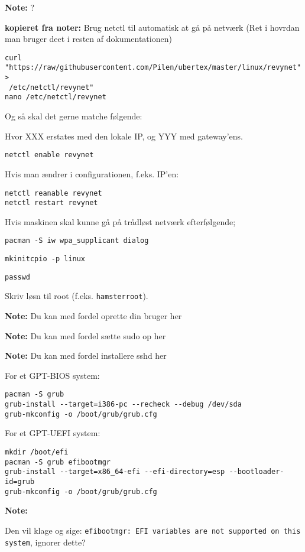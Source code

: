 \documentclass[10pt,a4paper,danish]{article}
\newcommand{\note}[1]{\begin{mdframed}[style=note]\textbf{Note:}
    #1\end{mdframed}}
\begin{document}
\note{?}
\begin{mdframed}[style=note]\textbf{kopieret fra noter:}
Brug netctl til automatisk at gå på netværk
(Ret i hovrdan man bruger deet i resten af dokumentationen)
\begin{verbatim}
curl "https://raw/githubusercontent.com/Pilen/ubertex/master/linux/revynet" >
 /etc/netctl/revynet"
nano /etc/netctl/revynet
\end{verbatim}
Og så skal det gerne matche følgende:
\begin{mdframed}[style=code]
  
\end{mdframed}
Hvor XXX erstates med den lokale IP, og YYY med gateway'ens.

\begin{verbatim}
netctl enable revynet
\end{verbatim}
Hvis man ændrer i configurationen, f.eks. IP'en:
\begin{verbatim}
netctl reanable revynet
netctl restart revynet
\end{verbatim}
\end{mdframed}

Hvis maskinen skal kunne gå på trådløst netværk efterfølgende;
\begin{verbatim}
pacman -S iw wpa_supplicant dialog
\end{verbatim}

\begin{verbatim}
mkinitcpio -p linux
\end{verbatim}
\begin{verbatim}
passwd
\end{verbatim}
Skriv løsn til root (f.eks. \texttt{hamsterroot}).

\note{Du kan med fordel oprette din bruger her}
\note{Du kan med fordel sætte sudo op her}
\note{Du kan med fordel installere sshd her}

For et GPT-BIOS system:
\begin{verbatim}
pacman -S grub
grub-install --target=i386-pc --recheck --debug /dev/sda
grub-mkconfig -o /boot/grub/grub.cfg
\end{verbatim}
For et GPT-UEFI system:
\begin{verbatim}
mkdir /boot/efi
pacman -S grub efibootmgr
grub-install --target=x86_64-efi --efi-directory=esp --bootloader-id=grub
grub-mkconfig -o /boot/grub/grub.cfg
\end{verbatim}
\note{
Den vil klage og sige: \texttt{efibootmgr: EFI variables are not supported on
  this system}, ignorer dette?}
\end{document}
